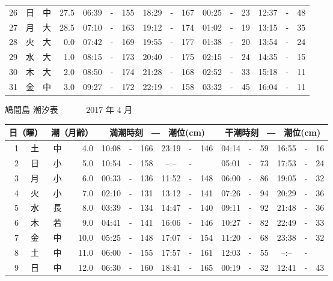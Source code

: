 \documentclass[12pt.a4j]{jsarticle}
\begin{document}
\begin{center}
\begin{table}[ht]
\begin{tabular}{|rc|cr|ccrccr|ccrccr|}
26 & 日 & 中 & 27.5 &  06:39 &-& 155  &  18:29 &-& 167  &   00:25 &-&  23  &   12:37 &-&  48  \\
27 & 月 & 大 & 28.5 &  07:10 &-& 163  &  19:12 &-& 174  &   01:02 &-&  19  &   13:15 &-&  35  \\
28 & 火 & 大 &  0.0 &  07:42 &-& 169  &  19:55 &-& 177  &   01:38 &-&  20  &   13:54 &-&  24  \\
29 & 水 & 大 &  1.0 &  08:15 &-& 173  &  20:40 &-& 175  &   02:15 &-&  24  &   14:35 &-&  15  \\
30 & 木 & 大 &  2.0 &  08:50 &-& 174  &  21:28 &-& 168  &   02:52 &-&  33  &   15:18 &-&  11  \\
31 & 金 & 中 &  3.0 &  09:27 &-& 172  &  22:19 &-& 158  &   03:32 &-&  45  &   16:04 &-&  11  \\
   \hline
   \end{tabular}
\end{table}
\newpage
 {\LARGE 鳩間島  潮汐表　　　}
 {\large 2017 年  4 月}\\
 \begin{table}[ht]
    \begin{tabular}{|rc|cr|ccrccr|ccrccr|}
    \hline
    \multicolumn{2}{|c|}{日（曜）} & \multicolumn{2}{c|}{潮（月齢）} & \multicolumn{6}{c|}{満潮時刻　―　潮位(cm)} & \multicolumn{6}{c|}{干潮時刻　―　潮位(cm)} \\
 \hline
 1 & 土 & 中 &  4.0 &  10:08 &-& 166  &  23:19 &-& 146  &   04:14 &-&  59  &   16:55 &-&  16  \\
 2 & 日 & 小 &  5.0 &  10:54 &-& 158  &  --:-- &-&     &   05:01 &-&  73  &   17:53 &-&  24  \\
 3 & 月 & 小 &  6.0 &  00:33 &-& 136  &  11:52 &-& 148  &   06:00 &-&  86  &   19:05 &-&  32  \\
 4 & 火 & 小 &  7.0 &  02:10 &-& 131  &  13:12 &-& 141  &   07:26 &-&  94  &   20:29 &-&  36  \\
 5 & 水 & 長 &  8.0 &  03:39 &-& 134  &  14:47 &-& 140  &   09:11 &-&  92  &   21:48 &-&  36  \\
 6 & 木 & 若 &  9.0 &  04:41 &-& 141  &  16:06 &-& 146  &   10:27 &-&  82  &   22:49 &-&  33  \\
 7 & 金 & 中 & 10.0 &  05:25 &-& 148  &  17:07 &-& 154  &   11:20 &-&  68  &   23:38 &-&  32  \\
 8 & 土 & 中 & 11.0 &  06:00 &-& 155  &  17:57 &-& 161  &   12:03 &-&  55  &   --:-- &-&     \\
 9 & 日 & 中 & 12.0 &  06:30 &-& 160  &  18:41 &-& 165  &   00:19 &-&  32  &   12:41 &-&  43  \\

\end{tabular}
\end{table}
\end{center}
\end{document}

